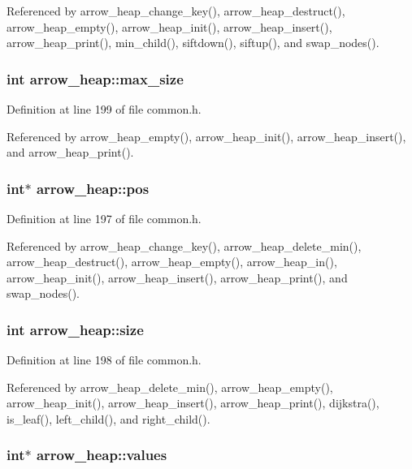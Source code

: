 Referenced by arrow\_\-heap\_\-change\_\-key(), arrow\_\-heap\_\-destruct(), arrow\_\-heap\_\-empty(), arrow\_\-heap\_\-init(), arrow\_\-heap\_\-insert(), arrow\_\-heap\_\-print(), min\_\-child(), siftdown(), siftup(), and swap\_\-nodes().\hypertarget{structarrow__heap_e668dd3f450ba07df5998b8d084e6949}{
\subsubsection[{max\_\-size}]{\setlength{\rightskip}{0pt plus 5cm}int {\bf arrow\_\-heap::max\_\-size}}}
\label{structarrow__heap_e668dd3f450ba07df5998b8d084e6949}




Definition at line 199 of file common.h.

Referenced by arrow\_\-heap\_\-empty(), arrow\_\-heap\_\-init(), arrow\_\-heap\_\-insert(), and arrow\_\-heap\_\-print().\hypertarget{structarrow__heap_a39c7b18964b26c78a96f51406d8d7ab}{
\subsubsection[{pos}]{\setlength{\rightskip}{0pt plus 5cm}int$\ast$ {\bf arrow\_\-heap::pos}}}
\label{structarrow__heap_a39c7b18964b26c78a96f51406d8d7ab}




Definition at line 197 of file common.h.

Referenced by arrow\_\-heap\_\-change\_\-key(), arrow\_\-heap\_\-delete\_\-min(), arrow\_\-heap\_\-destruct(), arrow\_\-heap\_\-empty(), arrow\_\-heap\_\-in(), arrow\_\-heap\_\-init(), arrow\_\-heap\_\-insert(), arrow\_\-heap\_\-print(), and swap\_\-nodes().\hypertarget{structarrow__heap_afeff09d63b1f6ec6fc910d3407972de}{
\subsubsection[{size}]{\setlength{\rightskip}{0pt plus 5cm}int {\bf arrow\_\-heap::size}}}
\label{structarrow__heap_afeff09d63b1f6ec6fc910d3407972de}




Definition at line 198 of file common.h.

Referenced by arrow\_\-heap\_\-delete\_\-min(), arrow\_\-heap\_\-empty(), arrow\_\-heap\_\-init(), arrow\_\-heap\_\-insert(), arrow\_\-heap\_\-print(), dijkstra(), is\_\-leaf(), left\_\-child(), and right\_\-child().\hypertarget{structarrow__heap_e2641f7a933ecb92d32acd3a50caa442}{
\subsubsection[{values}]{\setlength{\rightskip}{0pt plus 5cm}int$\ast$ {\bf arrow\_\-heap::values}}}
\label{structarrow__heap_e2641f7a933ecb92d32acd3a50caa442}




